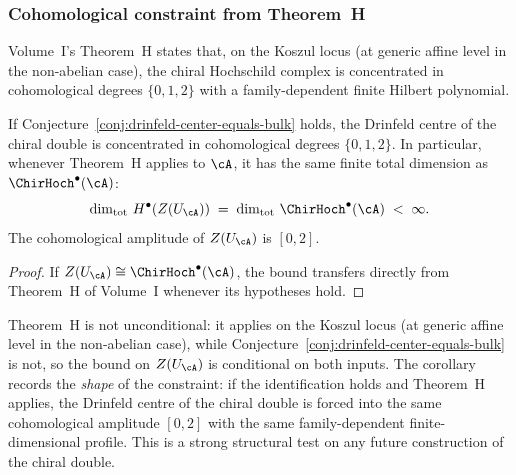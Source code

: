 \subsubsection{Cohomological constraint from Theorem~H}

Volume~I's Theorem~H states that, on the Koszul locus
\textup{(}at generic affine level in the non-abelian case\textup{)},
the chiral Hochschild complex is concentrated in cohomological
degrees $\{0,1,2\}$ with a family-dependent finite Hilbert
polynomial.

\begin{corollary}
\label{conj:drinfeld-center-amplitude}
If Conjecture~\textup{\ref{conj:drinfeld-center-equals-bulk}} holds, the
Drinfeld centre of the chiral double is concentrated in cohomological
degrees $\{0,1,2\}$. In particular, whenever Theorem~H applies to
$\cA$, it has the same finite total dimension as
$\ChirHoch^\bullet(\cA)$:
\begin{equation}
\dim_{\mathrm{tot}}\, H^\bullet(Z(U_\cA))
\;=\; \dim_{\mathrm{tot}}\, \ChirHoch^\bullet(\cA)
\;<\; \infty.
\end{equation}
The cohomological amplitude of $Z(U_\cA)$ is $[0,2]$.
\end{corollary}

\begin{proof}
If $Z(U_\cA) \cong \ChirHoch^\bullet(\cA)$, the bound transfers
directly from Theorem~H of Volume~I whenever its hypotheses hold.
\end{proof}

\begin{remark}
\label{rem:drinfeld-center-amplitude-constraint}
Theorem~H is not unconditional: it applies on the Koszul locus
\textup{(}at generic affine level in the non-abelian case\textup{)},
while Conjecture~\ref{conj:drinfeld-center-equals-bulk} is not, so the
bound on $Z(U_\cA)$ is conditional on both inputs. The corollary
records the \emph{shape} of the constraint: if the identification holds
and Theorem~H applies, the Drinfeld centre of the chiral double is
forced into the same cohomological amplitude $[0,2]$ with the same
family-dependent finite-dimensional profile. This is a strong
structural test on any future construction of the chiral double.
\end{remark}

